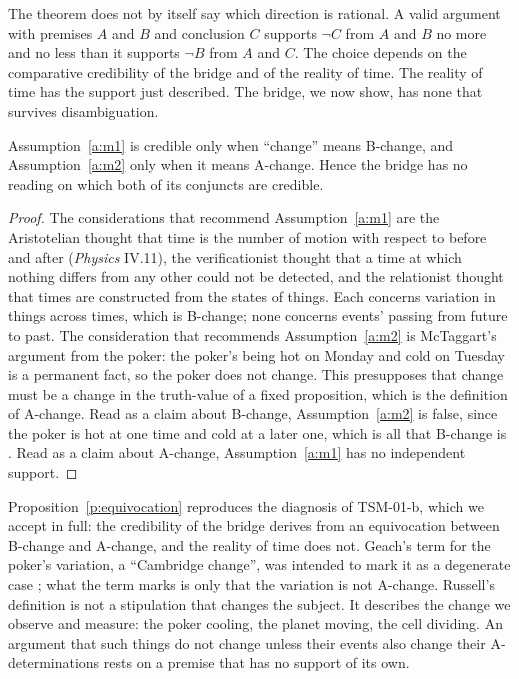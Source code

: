 \documentclass{situationist-preprint}
\begin{document}
The theorem does not by itself say which direction is rational. A valid argument with premises $A$ and $B$ and conclusion $C$ supports $\neg C$ from $A$ and $B$ no more and no less than it supports $\neg B$ from $A$ and $C$. The choice depends on the comparative credibility of the bridge and of the reality of time. The reality of time has the support just described. The bridge, we now show, has none that survives disambiguation.

\begin{proposition}\label{p:equivocation}
Assumption~\ref{a:m1} is credible only when \enquote{change} means B-change, and Assumption~\ref{a:m2} only when it means A-change. Hence the bridge has no reading on which both of its conjuncts are credible.
\end{proposition}

\begin{proof}
The considerations that recommend Assumption~\ref{a:m1} are the Aristotelian thought that time is the number of motion with respect to before and after (\emph{Physics} IV.11), the verificationist thought that a time at which nothing differs from any other could not be detected, and the relationist thought that times are constructed from the states of things. Each concerns variation in things across times, which is B-change; none concerns events' passing from future to past. The consideration that recommends Assumption~\ref{a:m2} is McTaggart's argument from the poker: the poker's being hot on Monday and cold on Tuesday is a permanent fact, so the poker does not change. This presupposes that change must be a change in the truth-value of a fixed proposition, which is the definition of A-change. Read as a claim about B-change, Assumption~\ref{a:m2} is false, since the poker is hot at one time and cold at a later one, which is all that B-change is \citep[§442]{Russell1903}. Read as a claim about A-change, Assumption~\ref{a:m1} has no independent support.
\end{proof}

Proposition~\ref{p:equivocation} reproduces the diagnosis of TSM-01-b, which we accept in full: the credibility of the bridge derives from an equivocation between B-change and A-change, and the reality of time does not. Geach's term for the poker's variation, a \enquote{Cambridge change}, was intended to mark it as a degenerate case \citep{Geach1969}; what the term marks is only that the variation is not A-change. Russell's definition is not a stipulation that changes the subject. It describes the change we observe and measure: the poker cooling, the planet moving, the cell dividing. An argument that such things do not change unless their events also change their A-determinations rests on a premise that has no support of its own.
\end{document}
